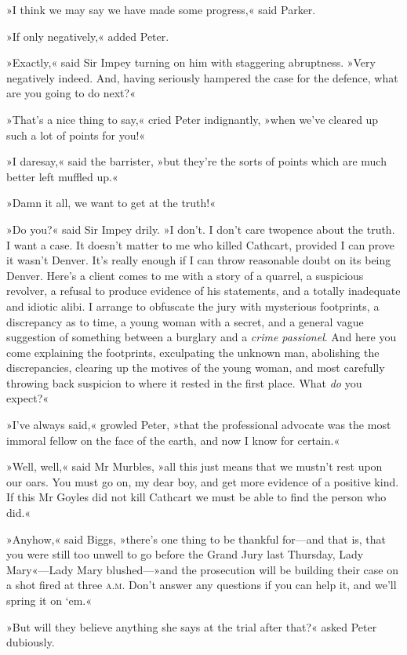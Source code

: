 »I think we may say we have made some progress,« said Parker.

»If only negatively,« added Peter.

»Exactly,« said Sir Impey turning on him with staggering abruptness.  »Very negatively indeed. And, having seriously hampered the case for the defence, what are you going to do next?«

»That's a nice thing to say,« cried Peter indignantly, »when we've cleared up such a lot of points for you!«

»I daresay,« said the barrister, »but they're the sorts of points which are much better left muffled up.«

»Damn it all, we want to get at the truth!«

»Do you?« said Sir Impey drily. »I don't. I don't care twopence about the truth. I want a case. It doesn't matter to me who killed Cathcart, provided I can prove it wasn't Denver. It's really enough if I can throw reasonable doubt on its being Denver. Here's a client comes to me with a story of a quarrel, a suspicious revolver, a refusal to produce evidence of his statements, and a totally inadequate and idiotic alibi. I arrange to obfuscate the jury with mysterious footprints, a discrepancy as to time, a young woman with a secret, and a general vague suggestion of something between a burglary and a \textit{crime passionel}. And here you come explaining the footprints, exculpating the unknown man, abolishing the discrepancies, clearing up the motives of the young woman, and most carefully throwing back suspicion to where it rested in the first place. What \textit{do} you expect?«

»I've always said,« growled Peter, »that the professional advocate was the most immoral fellow on the face of the earth, and now I know for certain.«

»Well, well,« said Mr Murbles, »all this just means that we mustn't rest upon our oars. You must go on, my dear boy, and get more evidence of a positive kind. If this Mr Goyles did not kill Cathcart we must be able to find the person who did.«

»Anyhow,« said Biggs, »there's one thing to be thankful for—and that is, that you were still too unwell to go before the Grand Jury last Thursday, Lady Mary«—Lady Mary blushed—»and the prosecution will be building their case on a shot fired at three \textsc{a.m.} Don't answer any questions if you can help it, and we'll spring it on `em.«

»But will they believe anything she says at the trial after that?« asked Peter dubiously.

